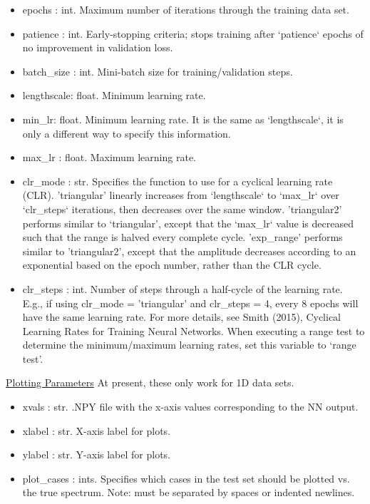 \documentclass[letterpaper, 12pt]{article}
\begin{document}
\begin{itemize}
\item epochs     : int.  Maximum number of iterations through the training data set.
\item patience   : int.  Early-stopping criteria; stops training after `patience` 
                   epochs of no improvement in validation loss.
\item batch\_size : int.  Mini-batch size for training/validation steps.

\item lengthscale: float. Minimum learning rate.
\item min\_lr: float.  Minimum learning rate.  It is the same as `lengthscale`, it is only 
                               a different way to specify this information.
\item max\_lr     : float. Maximum learning rate.
\item clr\_mode   : str.   Specifies the function to use for a cyclical learning rate 
                    (CLR).
                    'triangular' linearly increases from `lengthscale` to 
                    `max\_lr` over `clr\_steps` iterations, then decreases over the same 
                    window.
                    'triangular2' performs similar to `triangular', except that 
                    the `max\_lr` value is decreased such that the range is halved every 
                    complete cycle.
                    'exp\_range' performs similar to 'triangular2', except that 
                    the amplitude decreases according to an exponential based 
                    on the epoch number, rather than the CLR cycle.
\item clr\_steps  : int.   Number of steps through a half-cycle of the learning rate.
                    E.g., if using clr\_mode = 'triangular' and clr\_steps = 4, 
                    every 8 epochs will have the same learning rate.
                    For more details, see Smith (2015), Cyclical Learning Rates 
                    for Training Neural Networks.
                    When executing a range test to determine the minimum/maximum
                    learning rates, set this variable to `range test'.
\end{itemize}

\noindent \underline{Plotting Parameters}\newline
\noindent At present, these only work for 1D data sets.
\begin{itemize}
\item xvals       : str.  .NPY file with the x-axis values corresponding to 
                          the NN output.
\item xlabel      : str.  X-axis label for plots.
\item ylabel      : str.  Y-axis label for plots.
\item plot\_cases : ints. Specifies which cases in the test set should be 
                   plotted vs. the true spectrum.
                   Note: must be separated by spaces or indented newlines.
\end{itemize}
\end{document}
